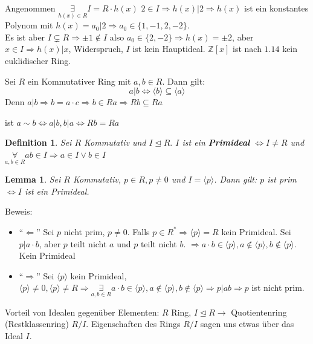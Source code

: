 \documentclass{article}
\newtheorem{defi}[thm]{Definition}
\newtheorem{lemma}[thm]{Lemma}
\newcommand{\Z}{\mathbb{Z}}
\begin{document}
Angenommen $\underset{h(x)\in R}\exists I=R\cdot h(x)$
$2\in I\Rightarrow h(x)|2\Rightarrow h(x)$ ist ein
konstantes Polynom mit $h(x)=a_0|2\Rightarrow a_0\in
\{1,-1,2,-2\}$.\\
Es ist aber $I\subsetneq R\Rightarrow\pm1\notin I$ also
$a_0\in\{2,-2\}\Rightarrow h(x)=\pm 2$, aber
$x\in I\Rightarrow h(x)|x$, Widerspruch, $I$ ist kein
Hauptideal.
$\Z[x]$ ist nach $1.14$ kein euklidischer Ring.
\color{black}

Sei $R$ ein Kommutativer Ring mit $a,b\in R$.
Dann gilt:
\begin{equation*}
    a|b\Leftrightarrow\langle b\rangle\subseteq\langle a
    \rangle
\end{equation*}
Denn $a|b\Rightarrow b=a\cdot c\Rightarrow b\in Ra
\Rightarrow Rb\subseteq Ra$

ist $a\sim b\Leftrightarrow a|b,b|a\Leftrightarrow Rb=Ra$
\begin{defi}
    Sei $R$ Kommutativ und $I\unlhd R.$ $I$ ist
    ein \textbf{Primideal} $\Leftrightarrow I\neq R$
    und $\underset{a,b\in R}\forall ab\in I\Rightarrow a\in
    I\lor b\in I$
\end{defi}
\begin{lemma}
    Sei $R$ Kommutativ, $p\in R,p\neq 0$ und $I=\langle p
    \rangle$. Dann gilt: $p$ ist prim $\Leftrightarrow I$
    ist ein Primideal.
\end{lemma}
Beweis:
\begin{itemize}
    \item ``$\Leftarrow$''
        Sei $p$ nicht prim, $p\neq 0$.
        Falls $p\in R^*\Rightarrow\langle p\rangle=R$ kein
        Primideal.
        Sei $p|a\cdot b$, aber $p$ teilt nicht $a$ und $p$
        teilt nicht $b$. $\Rightarrow a\cdot b\in\langle p
        \rangle,a\notin\langle p\rangle,b\notin\langle p
        \rangle$. Kein Primideal
    \item ``$\Rightarrow$''
        Sei $\langle p\rangle$ kein Primideal, $\langle p
        \rangle\neq 0,\langle p\rangle\neq R\Rightarrow
        \underset{a,b\in R}\exists a\cdot b\in\langle p
        \rangle,a\notin\langle p\rangle,b\notin\langle p
        \rangle\Rightarrow p|ab\Rightarrow p$ ist
        nicht prim.
\end{itemize}
\color{blue}
Vorteil von Idealen gegenüber Elementen:
$R$ Ring, $I\unlhd R\rightarrow$ Quotientenring
(Restklassenring) $R/I$. Eigenschaften des Rings $R/I$ sagen
uns etwas über das Ideal $I$.
\end{document}
